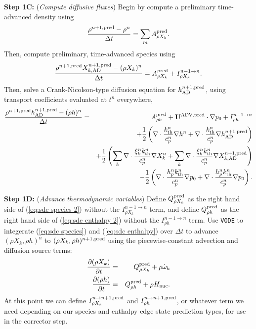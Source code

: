 {\bf Step 1C:} ({\it Compute diffusive fluxes}) Begin by compute a preliminary time-advanced density using
\begin{equation}
\frac{\rho^{n+1,{\rm pred}} - \rho^n}{\Delta t} = \sum_mA_{\rho X_k}^{\rm pred}.
\end{equation}
Then, compute preliminary, time-advanced species using
\begin{equation}
\frac{\rho^{n+1,{\rm pred}}X_{k,{\rm AD}}^{n+1,{\rm pred}} - (\rho X_k)^n}{\Delta t} = A_{\rho X_k}^{\rm pred} + I_{\rho X_k}^{n-1\rightarrow n}.\label{eq:sdc species 2}
\end{equation}
Then, solve a Crank-Nicolson-type diffusion equation for $h^{n+1,{\rm pred}}_{\rm AD}$, using transport coefficients evaluated at $t^n$ everywhere,
\begin{eqnarray}
\frac{\rho^{n+1,{\rm pred}}h^{n+1,{\rm pred}}_{\rm AD} - (\rho h)^n}{\Delta t} &=& A_{\rho h}^{\rm pred} + \mathbf{U}^{\mathrm{ADV},\mathrm{pred}}\cdot\nabla p_0 + I_{\rho h}^{n-1\rightarrow n}\nonumber\\
&& + \frac{1}{2}\left(\nabla\cdot\frac{k_{\rm th}^n}{c_p^n}\nabla h^n + \nabla\cdot\frac{k_{\rm th}^n}{c_p^n}\nabla h_{\rm AD}^{n+1,{\rm pred}}\right)\nonumber\\
&& + \frac{1}{2}\left(\sum_k\nabla\cdot\frac{\xi_k^n k_{\rm th}^n}{c_p^n}\nabla X_k^n + \sum_k\nabla\cdot\frac{\xi_k^n k_{\rm th}^n}{c_p^n}\nabla X_{k,{\rm AD}}^{n+1,{\rm pred}}\right)\nonumber\\
&& - \frac{1}{2}\left(\nabla\cdot\frac{h_p^n k_{\rm th}^n}{c_p^n}\nabla p_0 + \nabla\cdot\frac{h_p^n k_{\rm th}^n}{c_p^n}\nabla p_0\right).\label{eq:sdc enthalpy 2}
\end{eqnarray}

{\bf Step 1D:} ({\it Advance thermodynamic variables}) Define $Q_{\rho X_k}^{\rm pred}$ as the right hand side of (\ref{eq:sdc species 2}) without the $I_{\rho X_k}^{n-1\rightarrow n}$ term, and define $Q_{\rho h}^{\rm pred}$ as the right hand side of (\ref{eq:sdc enthalpy 2}) without the $I_{\rho h}^{n-1\rightarrow n}$ term.  Use {\tt VODE} to integerate (\ref{eq:sdc species}) and (\ref{eq:sdc enthalpy}) over $\Delta t$ to advance $(\rho X_k, \rho h)^n$ to $(\rho X_k, \rho h)^{n+1,{\rm pred}}$ using the piecewise-constant advection and diffusion source terms:
\begin{eqnarray}
\frac{\partial(\rho X_k)}{\partial t} &=& Q_{\rho X_k}^{\rm pred} + \rho\dot\omega_k\\
\frac{\partial(\rho h)}{\partial t} &=& Q_{\rho h}^{\rm pred} + \rho{H_{\rm nuc}}.
\end{eqnarray}
At this point we can define $I_{\rho X_k}^{n\rightarrow n+1,{\rm pred}}$ and $I_{\rho h}^{n\rightarrow n+1,{\rm pred}}$, or whatever term we need depending on our species and enthalpy edge state prediction types, for use in the corrector step.\\

